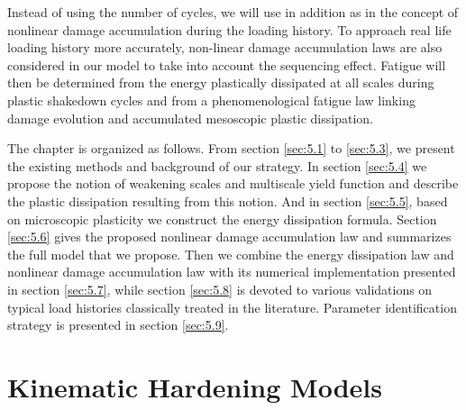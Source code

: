 Instead of using the number of cycles, we will use in addition as in \cite{lemaitre1999two} the concept of nonlinear damage accumulation during the loading history. To approach real life loading history more accurately, non-linear damage accumulation laws are also considered in our model to take into account the sequencing effect. Fatigue will then be determined from the energy plastically dissipated at all scales during plastic shakedown cycles and from a phenomenological fatigue law linking damage evolution and accumulated mesoscopic plastic dissipation.

The chapter is organized as follows. From section \ref{sec:5.1} to \ref{sec:5.3}, we present the existing methods and background of our strategy.  In section \ref{sec:5.4} we propose the notion of weakening scales and multiscale yield function and describe the plastic dissipation resulting from this notion. And in section \ref{sec:5.5}, based on microscopic plasticity we construct the energy dissipation formula. Section \ref{sec:5.6} gives the proposed nonlinear damage accumulation law and summarizes the full model that we propose. Then we combine the energy dissipation law and nonlinear damage accumulation law with its numerical implementation presented in section \ref{sec:5.7}, while section \ref{sec:5.8} is devoted to various validations on typical load histories classically treated in the literature. Parameter identification strategy is presented in section \ref{sec:5.9}.



\section{Kinematic Hardening Models}
